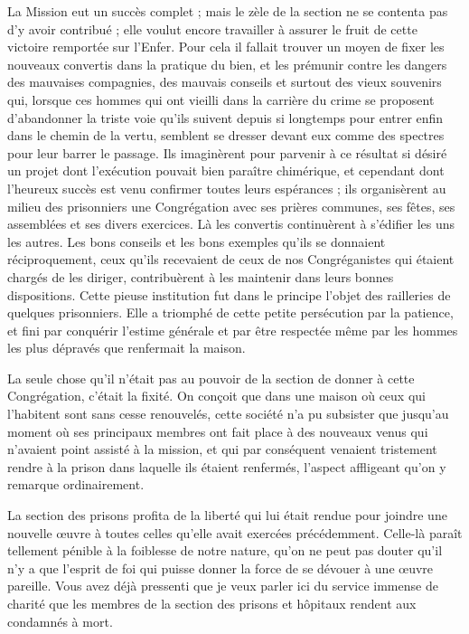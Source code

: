 La Mission eut un succès complet ; mais le zèle de la section ne se contenta pas d'y avoir contribué ; elle voulut encore travailler à assurer le fruit de cette victoire remportée sur l'Enfer. Pour cela il fallait trouver un moyen de fixer les nouveaux convertis dans la pratique du bien, et les prémunir contre les dangers des mauvaises compagnies, des mauvais conseils et surtout des vieux souvenirs qui, lorsque ces hommes qui ont vieilli dans la carrière du crime se proposent d'abandonner la triste voie qu'ils suivent depuis si longtemps pour entrer enfin dans le chemin de la vertu, semblent se dresser devant eux comme des spectres pour leur
barrer le passage. Ils imaginèrent pour parvenir à ce résultat si désiré un projet dont l'exécution pouvait bien paraître chimérique, et cependant dont l'heureux succès est venu confirmer toutes leurs espérances ; ils organisèrent au milieu des prisonniers une Congrégation avec ses prières communes, ses fêtes, ses assemblées et ses divers exercices. Là les convertis continuèrent à s'édifier les uns les autres. Les bons conseils et les bons exemples qu'ils se donnaient réciproquement, ceux qu'ils recevaient de ceux de nos Congréganistes qui étaient chargés de les diriger, contribuèrent à les maintenir dans leurs bonnes dispositions. Cette pieuse institution fut dans le principe l'objet des railleries de quelques prisonniers. Elle a triomphé de cette petite persécution par la patience, et fini par conquérir l'estime générale et par être respectée même par les hommes les plus dépravés que renfermait la maison.

La seule chose qu'il n'était pas au pouvoir de la section de donner à cette Congrégation, c'était la fixité. On conçoit que dans une maison où ceux qui l'habitent sont sans cesse renouvelés, cette société n'a pu subsister que jusqu'au moment où ses principaux membres ont fait place à des nouveaux venus qui n'avaient point assisté à la mission, et qui par conséquent venaient tristement rendre à la prison dans laquelle ils étaient renfermés, l'aspect affligeant qu'on y remarque ordinairement.

La section des prisons profita de la liberté qui lui était rendue pour joindre une nouvelle œuvre à toutes celles qu'elle avait exercées précédemment. Celle-là paraît tellement pénible à la foiblesse de notre nature, qu'on ne peut pas douter qu'il n'y a que l'esprit de foi qui puisse donner la force de
se dévouer à une œuvre pareille. Vous avez déjà pressenti que je veux parler ici du service immense de charité que les membres de la section des prisons et hôpitaux rendent aux condamnés à mort.

